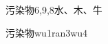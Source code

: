 \begin{entry}{污染物}{6,9,8}{⽔、⽊、⽜}
  \begin{phonetics}{污染物}{wu1ran3wu4}
  \end{phonetics}
\end{entry}
